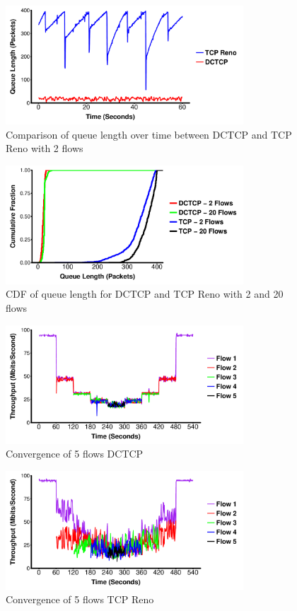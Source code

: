 \begin{figure}
\includegraphics[height=1.75in,width=3.5in]{queue_2_flows}
\caption{Comparison of queue length over time between DCTCP and TCP Reno with 2 flows}
\end{figure}

\begin{figure}
\includegraphics[height=1.75in,width=3.5in]{queue_cdf}
\caption{CDF of queue length for DCTCP and TCP Reno with 2 and 20 flows}
\end{figure}

\begin{figure}
\includegraphics[height=1.75in,width=3.5in]{dctcp_converg}
\caption{Convergence of 5 flows DCTCP}
\end{figure}

\begin{figure}
\includegraphics[height=1.75in,width=3.5in]{reno_converg}
\caption{Convergence of 5 flows TCP Reno}
\end{figure}

